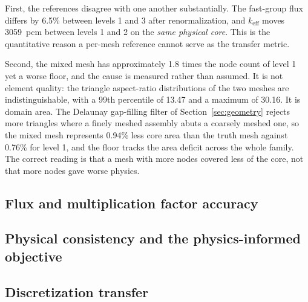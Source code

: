 \documentclass[preprint,12pt]{elsarticle}
\newcommand{\keff}{k_{\mathrm{eff}}}
\begin{document}
First, the references disagree with one another substantially. The fast-group
flux differs by 6.5\% between levels 1 and 3 after renormalization, and $\keff$
moves 3059~pcm between levels 1 and 2 on the \emph{same physical core}. This is
the quantitative reason a per-mesh reference cannot serve as the transfer
metric.

Second, the mixed mesh has approximately 1.8 times the node count of level 1
yet a worse floor, and the cause is measured rather than assumed. It is not
element quality: the triangle aspect-ratio distributions of the two meshes are
indistinguishable, with a 99th percentile of 13.47 and a maximum of 30.16. It
is domain area. The Delaunay gap-filling filter of Section~\ref{sec:geometry}
rejects more triangles where a finely meshed assembly abuts a coarsely meshed
one, so the mixed mesh represents 0.94\% less core area than the truth mesh
against 0.76\% for level 1, and the floor tracks the area deficit across the
whole family. The correct reading is that a mesh with more nodes covered less
of the core, not that more nodes gave worse physics.

\subsection{Flux and multiplication factor accuracy}
\label{sec:res-accuracy}

\subsection{Physical consistency and the physics-informed objective}
\label{sec:res-physics}

\subsection{Discretization transfer}
\label{sec:res-discretization}
\end{document}
